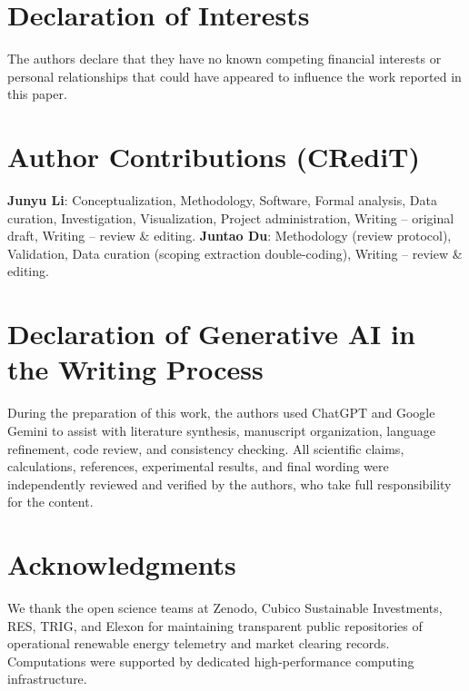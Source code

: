 \documentclass[3p,twocolumn,times]{elsarticle}
\theoremstyle{definition}
\theoremstyle{remark}
\begin{document}










\appendix


\section*{Declaration of Interests}
The authors declare that they have no known competing financial interests or personal relationships that could have appeared to influence the work reported in this paper.

\section*{Author Contributions (CRediT)}
\textbf{Junyu Li}: Conceptualization, Methodology, Software, Formal analysis, Data curation, Investigation, Visualization, Project administration, Writing -- original draft, Writing -- review \& editing. \textbf{Juntao Du}: Methodology (review protocol), Validation, Data curation (scoping extraction double-coding), Writing -- review \& editing.

\section*{Declaration of Generative AI in the Writing Process}
During the preparation of this work, the authors used ChatGPT and Google Gemini to assist with literature synthesis, manuscript organization, language refinement, code review, and consistency checking. All scientific claims, calculations, references, experimental results, and final wording were independently reviewed and verified by the authors, who take full responsibility for the content.

\section*{Acknowledgments}
We thank the open science teams at Zenodo, Cubico Sustainable Investments, RES, TRIG, and Elexon for maintaining transparent public repositories of operational renewable energy telemetry and market clearing records. Computations were supported by dedicated high-performance computing infrastructure.
\end{document}
